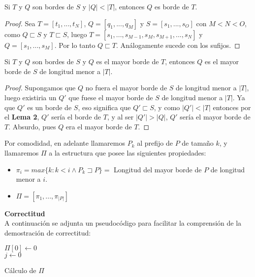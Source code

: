 \begin{lem}
Si $T$ y $Q$ son bordes de $S$ y $|Q|<|T|$, entonces $Q$ es borde de $T$.
\end{lem}
\begin{proof}
Sea $T = [t_1,...,t_N]$, $Q = [q_1,...,q_M]$ y $S = [s_1,...,s_O]$ con $M < N < O$, como $Q \sqsubset S$ y $T \sqsubset S$, luego $T = [s_1,..., s_{M-1},s_M,s_{M+1},...,s_N]$ y $Q = [s_1,...,s_M]$. Por lo tanto $Q \sqsubset T$. Análogamente sucede con los sufijos.
\end{proof}

\begin{lem}
Si $T$ y $Q$ son bordes de $S$ y $Q$ es el mayor borde de $T$, entonces $Q$ es el mayor borde de $S$ de longitud menor a $|T|$.
\end{lem}
\begin{proof}
Supongamos que $Q$ no fuera el mayor borde de $S$ de longitud menor a $|T|$, luego existiria un $Q'$ que fuese el mayor borde de $S$ de longitud menor a $|T|$. Ya que $Q'$ es un borde de $S$, eso significa que $Q' \sqsubset S$, y como $|Q'| < |T|$ entonces por el \textbf{Lema 2}, $Q'$ sería el borde de $T$, y al ser $|Q'| > |Q|$, $Q'$ sería el mayor borde de $T$. Absurdo, pues $Q$ era el mayor borde de $T$.
\end{proof}

Por comodidad, en adelante llamaremos $P_k$ al prefijo de $P$ de tamaño $k$, y llamaremos $\Pi$ a la estructura que posee las siguientes propiedades:
\begin{itemize}
	\item $\pi_i = max \{k: k < i \wedge P_k \sqsupset P\} = $ Longitud del mayor borde de $P$ de longitud menor a $i$.
	\item $\Pi = [\pi_1,...,\pi_{|P|}]$
\end{itemize}

\textbf{Correctitud}\\
A continuación se adjunta un pseudocódigo para facilitar la comprensión de la demostración de correctitud:\\
\begin{algorithm}[H]
 \DontPrintSemicolon
 \KwResult{$\Pi$}
 $\Pi[0] \gets 0$\\
 $j \gets 0$\\
 \caption{Cálculo de $\Pi$}
\end{algorithm}

